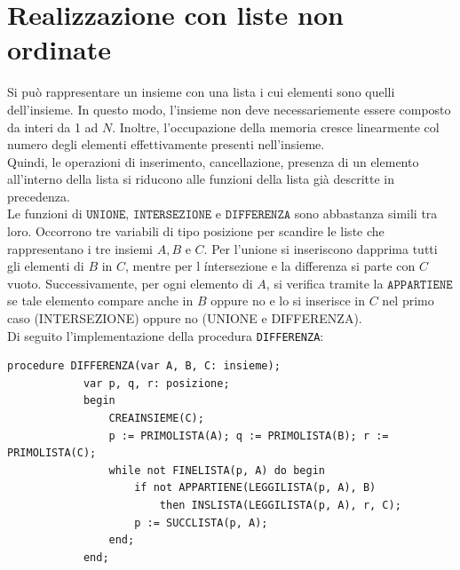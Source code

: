 \documentclass[12pt]{report}
\begin{document}
	\section{Realizzazione con liste non ordinate}
	Si può rappresentare un insieme con una lista i cui elementi sono quelli dell'insieme. In questo modo, l'insieme non deve necessariemente essere composto da interi da 1 ad $N$. Inoltre, l'occupazione della memoria cresce linearmente col numero degli elementi effettivamente presenti nell'insieme. \\
	Quindi, le operazioni di inserimento, cancellazione, presenza di un elemento all'interno della lista si riducono alle funzioni della lista già descritte in precedenza.  \\
	Le funzioni di $\texttt{UNIONE, INTERSEZIONE}$  e $\texttt{DIFFERENZA}$ sono abbastanza simili tra loro. Occorrono tre variabili di tipo posizione per scandire le liste che rappresentano i tre insiemi $A, B$ e $C$. Per l'unione si inseriscono dapprima tutti gli elementi di $B$ in $C$, mentre per l íntersezione e la differenza si parte con $C$ vuoto. Successivamente, per ogni elemento di $A$, si verifica tramite la $\texttt{APPARTIENE}$ se tale elemento compare anche in $B$ oppure no e lo si inserisce in $C$ nel primo caso (INTERSEZIONE) oppure no (UNIONE e DIFFERENZA). \\
	Di seguito l'implementazione della procedura \texttt{DIFFERENZA}:
	\begin{lstlisting}[style=pascalstyle]
		procedure DIFFERENZA(var A, B, C: insieme);
			var p, q, r: posizione;
			begin
				CREAINSIEME(C);
				p := PRIMOLISTA(A); q := PRIMOLISTA(B); r := PRIMOLISTA(C);
				while not FINELISTA(p, A) do begin
					if not APPARTIENE(LEGGILISTA(p, A), B)
						then INSLISTA(LEGGILISTA(p, A), r, C);
					p := SUCCLISTA(p, A);
				end;
			end;
	\end{lstlisting}
\end{document}
